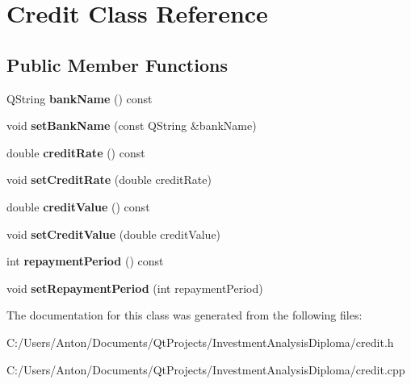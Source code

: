 \hypertarget{class_credit}{}\section{Credit Class Reference}
\label{class_credit}
\subsection*{Public Member Functions}
\begin{DoxyCompactItemize}
\item 
\hypertarget{class_credit_a0ba28d10c484b0a6d42a3b44119dd209}{}Q\+String {\bfseries bank\+Name} () const \label{class_credit_a0ba28d10c484b0a6d42a3b44119dd209}

\item 
\hypertarget{class_credit_a32b7b7e7b66b9c7c870ae4034994cb1e}{}void {\bfseries set\+Bank\+Name} (const Q\+String \&bank\+Name)\label{class_credit_a32b7b7e7b66b9c7c870ae4034994cb1e}

\item 
\hypertarget{class_credit_ad4fb475785f21596d5fdbb7ffa12b8d3}{}double {\bfseries credit\+Rate} () const \label{class_credit_ad4fb475785f21596d5fdbb7ffa12b8d3}

\item 
\hypertarget{class_credit_a2a08e48a7e87086b0cd1719fff123cfc}{}void {\bfseries set\+Credit\+Rate} (double credit\+Rate)\label{class_credit_a2a08e48a7e87086b0cd1719fff123cfc}

\item 
\hypertarget{class_credit_a37fe976e4d33c40db5a2be2e5ce4ea6d}{}double {\bfseries credit\+Value} () const \label{class_credit_a37fe976e4d33c40db5a2be2e5ce4ea6d}

\item 
\hypertarget{class_credit_acf22df48a1619f8a6210d473921ae801}{}void {\bfseries set\+Credit\+Value} (double credit\+Value)\label{class_credit_acf22df48a1619f8a6210d473921ae801}

\item 
\hypertarget{class_credit_ac21c56a88a57483392c1c96d466f03a5}{}int {\bfseries repayment\+Period} () const \label{class_credit_ac21c56a88a57483392c1c96d466f03a5}

\item 
\hypertarget{class_credit_a2496520ec0cfc37a832bd4861b6168cc}{}void {\bfseries set\+Repayment\+Period} (int repayment\+Period)\label{class_credit_a2496520ec0cfc37a832bd4861b6168cc}

\end{DoxyCompactItemize}


The documentation for this class was generated from the following files\+:\begin{DoxyCompactItemize}
\item 
C\+:/\+Users/\+Anton/\+Documents/\+Qt\+Projects/\+Investment\+Analysis\+Diploma/credit.\+h\item 
C\+:/\+Users/\+Anton/\+Documents/\+Qt\+Projects/\+Investment\+Analysis\+Diploma/credit.\+cpp\end{DoxyCompactItemize}
